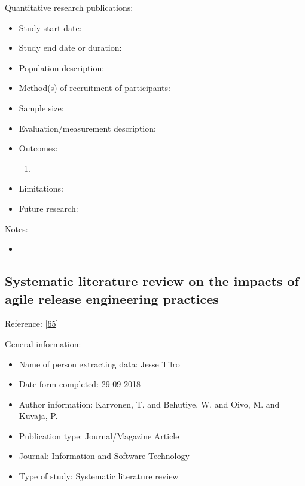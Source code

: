 \documentclass[]{book}
\providecommand{\tightlist}{%
  \setlength{\itemsep}{0pt}\setlength{\parskip}{0pt}}
\begin{document}
Quantitative research publications:

\begin{itemize}
\tightlist
\item
  Study start date:
\item
  Study end date or duration:
\item
  Population description:
\item
  Method(s) of recruitment of participants:
\item
  Sample size:
\item
  Evaluation/measurement description:
\item
  Outcomes:

  \begin{enumerate}
  \def\labelenumi{\arabic{enumi}.}
  \item
  \end{enumerate}
\item
  Limitations:
\item
  Future research:
\end{itemize}

Notes:

\begin{itemize}
\item
\end{itemize}

\subsection{Systematic literature review on the impacts of agile release
engineering
practices}\label{systematic-literature-review-on-the-impacts-of-agile-release-engineering-practices}

Reference: {[}\protect\hyperlink{ref-karvonen2017a}{65}{]}

General information:

\begin{itemize}
\tightlist
\item
  Name of person extracting data: Jesse Tilro
\item
  Date form completed: 29-09-2018
\item
  Author information: Karvonen, T. and Behutiye, W. and Oivo, M. and
  Kuvaja, P.
\item
  Publication type: Journal/Magazine Article
\item
  Journal: Information and Software Technology
\item
  Type of study: Systematic literature review
\end{itemize}
\end{document}

